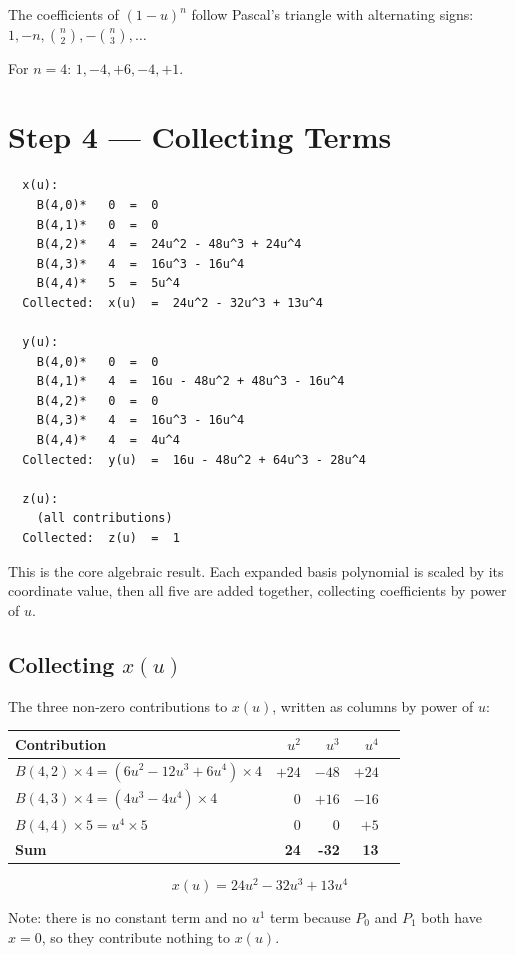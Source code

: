 \documentclass[12pt, a4paper]{article}
\begin{document}
\begin{notebox}
The coefficients of $(1-u)^n$ follow Pascal's triangle with
alternating signs: $1, -n, \binom{n}{2}, -\binom{n}{3}, \ldots$

For $n = 4$: $1, -4, +6, -4, +1$.
\end{notebox}


\section{Step 4 --- Collecting Terms}

\begin{verbatim}
  x(u):
    B(4,0)*   0  =  0
    B(4,1)*   0  =  0
    B(4,2)*   4  =  24u^2 - 48u^3 + 24u^4
    B(4,3)*   4  =  16u^3 - 16u^4
    B(4,4)*   5  =  5u^4
  Collected:  x(u)  =  24u^2 - 32u^3 + 13u^4

  y(u):
    B(4,0)*   0  =  0
    B(4,1)*   4  =  16u - 48u^2 + 48u^3 - 16u^4
    B(4,2)*   0  =  0
    B(4,3)*   4  =  16u^3 - 16u^4
    B(4,4)*   4  =  4u^4
  Collected:  y(u)  =  16u - 48u^2 + 64u^3 - 28u^4

  z(u):
    (all contributions)
  Collected:  z(u)  =  1
\end{verbatim}

This is the core algebraic result.
Each expanded basis polynomial is scaled by its coordinate value,
then all five are added together, collecting coefficients
by power of $u$.

\subsection{Collecting $x(u)$}

\begin{examplebox}
The three non-zero contributions to $x(u)$, written as columns by power of $u$:

\medskip
\begin{center}
\begin{tabular}{lrrrr}
\toprule
Contribution & $u^2$ & $u^3$ & $u^4$ \\
\midrule
$B(4,2) \times 4 = (6u^2 - 12u^3 + 6u^4) \times 4$ & $+24$ & $-48$ & $+24$ \\
$B(4,3) \times 4 = (4u^3 - 4u^4) \times 4$          & $0$   & $+16$ & $-16$ \\
$B(4,4) \times 5 = u^4 \times 5$                     & $0$   & $0$   & $+5$  \\
\midrule
\textbf{Sum}                                          & \textbf{24} & \textbf{-32} & \textbf{13} \\
\bottomrule
\end{tabular}
\end{center}

\medskip
\[
  x(u) = 24u^2 - 32u^3 + 13u^4
\]

Note: there is no constant term and no $u^1$ term because $P_0$ and $P_1$
both have $x = 0$, so they contribute nothing to $x(u)$.
\end{examplebox}
\end{document}
